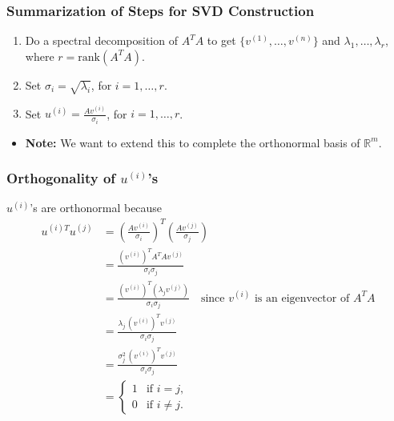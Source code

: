 \subsubsection{Summarization of Steps for SVD Construction}
\begin{derivation}
    \begin{enumerate}
        \item Do a spectral decomposition of \( A^T A \) to get \( \{ v^{(1)}, \dots, v^{(n)} \} \) and \( \lambda_1, \dots, \lambda_r \), where \( r = \text{rank}(A^T A) \).

        \item Set \( \sigma_i = \sqrt{\lambda_i} \), for \( i = 1, \dots, r \).
        
        \item Set \( u^{(i)} = \frac{A v^{(i)}}{\sigma_i} \), for \( i = 1, \dots, r \).
    \end{enumerate}
    \begin{itemize}
        \item \textbf{Note:} We want to extend this to complete the orthonormal basis of \( \mathbb{R}^m \).
    \end{itemize}
\end{derivation}

\subsubsection{Orthogonality of \( u^{(i)} \)'s}
\begin{derivation}
    \( u^{(i)} \)'s are orthonormal because
    \begin{align*}
        u^{(i) T} u^{(j)} &= \left( \frac{A v^{(i)}}{\sigma_i} \right)^T \left( \frac{A v^{(j)}}{\sigma_j} \right) \\
        &= \frac{(v^{(i)})^T A^T A v^{(j)}}{\sigma_i \sigma_j} \\
        &= \frac{(v^{(i)})^T (\lambda_j v^{(j)})}{\sigma_i \sigma_j} \quad \text{since $v^{(i)}$ is an eigenvector of $A^T A$} \\
        &= \frac{\lambda_j \, (v^{(i)})^T v^{(j)}}{\sigma_i \sigma_j} \\
        &= \frac{\sigma_j^2 \, (v^{(i)})^T v^{(j)}}{\sigma_i \sigma_j} \\
        &= \begin{cases} 
            1 & \text{if } i = j, \\
            0 & \text{if } i \neq j.
        \end{cases}
    \end{align*}
\end{derivation}

